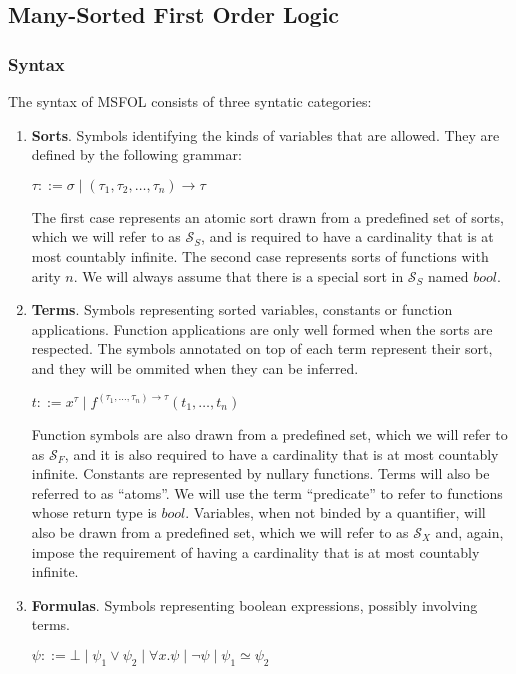 \subsection{Many-Sorted First Order Logic}\label{sec:msfolHere}
\subsubsection{Syntax}

The syntax of MSFOL consists of three syntatic categories:

\begin{enumerate}
  \item \textbf{Sorts}. Symbols identifying the kinds of variables that are allowed. They are defined by the following grammar:
        \begin{center}
          $ \tau ::= \sigma \mid (\tau_{1}, \tau_{2}, \ldots, \tau_{n}) \rightarrow \tau$ %
        \end{center}
        The first case represents an atomic sort drawn from a predefined set of sorts, which we will refer to as $\mathcal{S}_{S}$, and is required to have a cardinality that is at most countably infinite. The second case represents sorts of functions with arity $n$. We will always assume that there is a special sort in $\mathcal{S}_{S}$ named $\textit{bool}$.
  \item \textbf{Terms}. Symbols representing sorted variables, constants or function applications. Function applications are only well formed when the sorts are respected. The symbols annotated on top of each term represent their sort, and they will be ommited when they can be inferred.
        \begin{center}
          $ t ::= x^{\tau} \mid f^{(\tau_{1}, \ldots, \tau_{n}) \rightarrow \tau}(t_{1}, \dots, t_{n}) $
        \end{center}
        Function symbols are also drawn from a predefined set, which we will refer to as $\mathcal{S}_{F}$, and it is also required to have a cardinality that is at most countably infinite. Constants are represented by nullary functions. Terms will also be referred to as ``atoms''. We will use the term ``predicate'' to refer to functions whose return type is $\textit{bool}$. Variables, when not binded by a quantifier, will also be drawn from a predefined set, which we will refer to as $\mathcal{S}_{X}$ and, again, impose the requirement of having a cardinality that is at most countably infinite.
  \item \textbf{Formulas}. Symbols representing boolean expressions, possibly involving terms.
        \begin{center}
          $ \psi ::= \bot \mid \psi_{1} \vee \psi_{2} \mid \forall x.\psi \mid \neg \psi \mid \psi_{1} \simeq \psi_{2}$
        \end{center}
\end{enumerate}

